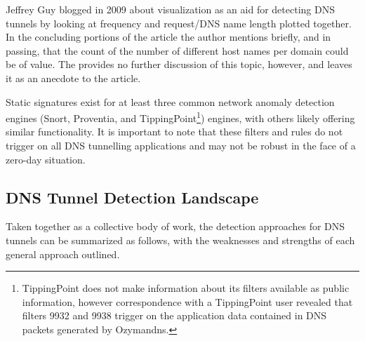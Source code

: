 \documentclass[12pt]{article}
\theoremstyle{remark}
\theoremstyle{definition}
\theoremstyle{definition}
\theoremstyle{definition}
\begin{document}
Jeffrey Guy blogged in 2009 about visualization as an aid for detecting DNS
tunnels by looking at frequency and request/DNS name length plotted together. In
the concluding portions of the article the author mentions briefly, and in
passing, that the count of the number of different host names per domain could
be of value. The provides no further discussion of this topic, however, and
leaves it as an anecdote to the article.

Static signatures exist for at least three common network anomaly detection
engines (Snort\cite{Chamberland2009.snort_iodine},
Proventia\cite{Proventia2013.ips_tunnel}, and TippingPoint\footnote{TippingPoint
does not make information about its filters available as public information,
however correspondence with a TippingPoint user revealed that filters 9932 and
9938 trigger on the application data contained in DNS packets generated by
Ozymandns.}) engines, with others likely offering similar functionality. It is
important to note that these filters and rules do not trigger on all DNS
tunnelling applications and may not be robust in the face of a zero-day
situation.

\subsection{DNS Tunnel Detection Landscape}
\label{litsummary}
Taken together as a collective body of work, the detection approaches for DNS
tunnels can be summarized as follows, with the weaknesses and strengths of each general approach outlined.
\end{document}
